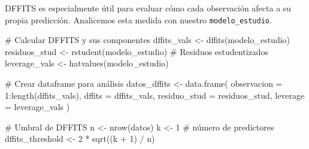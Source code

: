 \documentclass[
  letterpaper,
  DIV=11,
  numbers=noendperiod]{scrreprt}
\newenvironment{Shaded}{\begin{snugshade}}{\end{snugshade}}
\newcommand{\AttributeTok}[1]{\textcolor[rgb]{0.40,0.45,0.13}{#1}}
\newcommand{\CommentTok}[1]{\textcolor[rgb]{0.37,0.37,0.37}{#1}}
\newcommand{\DecValTok}[1]{\textcolor[rgb]{0.68,0.00,0.00}{#1}}
\newcommand{\FunctionTok}[1]{\textcolor[rgb]{0.28,0.35,0.67}{#1}}
\newcommand{\NormalTok}[1]{\textcolor[rgb]{0.00,0.23,0.31}{#1}}
\newcommand{\OtherTok}[1]{\textcolor[rgb]{0.00,0.23,0.31}{#1}}
\newcommand{\SpecialCharTok}[1]{\textcolor[rgb]{0.37,0.37,0.37}{#1}}
\begin{document}
\begin{tcolorbox}[enhanced jigsaw, breakable, toprule=.15mm, bottomtitle=1mm, coltitle=black, colbacktitle=quarto-callout-tip-color!10!white, titlerule=0mm, opacitybacktitle=0.6, bottomrule=.15mm, toptitle=1mm, title=\textcolor{quarto-callout-tip-color}{\faLightbulb}\hspace{0.5em}{Ejemplo: Cálculo y análisis de DFFITS}, arc=.35mm, rightrule=.15mm, opacityback=0, colframe=quarto-callout-tip-color-frame, leftrule=.75mm, left=2mm, colback=white]

DFFITS es especialmente útil para evaluar cómo cada observación afecta a
su propia predicción. Analicemos esta medida con nuestro
\texttt{modelo\_estudio}.

\begin{Shaded}
\begin{Highlighting}[]
\CommentTok{\# Calcular DFFITS y sus componentes}
\NormalTok{dffits\_vals }\OtherTok{\textless{}{-}} \FunctionTok{dffits}\NormalTok{(modelo\_estudio)}
\NormalTok{residuos\_stud }\OtherTok{\textless{}{-}} \FunctionTok{rstudent}\NormalTok{(modelo\_estudio)  }\CommentTok{\# Residuos estudentizados}
\NormalTok{leverage\_vals }\OtherTok{\textless{}{-}} \FunctionTok{hatvalues}\NormalTok{(modelo\_estudio)}

\CommentTok{\# Crear dataframe para análisis}
\NormalTok{datos\_dffits }\OtherTok{\textless{}{-}} \FunctionTok{data.frame}\NormalTok{(}
  \AttributeTok{observacion =} \DecValTok{1}\SpecialCharTok{:}\FunctionTok{length}\NormalTok{(dffits\_vals),}
  \AttributeTok{dffits =}\NormalTok{ dffits\_vals,}
  \AttributeTok{residuo\_stud =}\NormalTok{ residuos\_stud,}
  \AttributeTok{leverage =}\NormalTok{ leverage\_vals}
\NormalTok{)}

\CommentTok{\# Umbral de DFFITS}
\NormalTok{n }\OtherTok{\textless{}{-}} \FunctionTok{nrow}\NormalTok{(datos)}
\NormalTok{k }\OtherTok{\textless{}{-}} \DecValTok{1}  \CommentTok{\# número de predictores}
\NormalTok{dffits\_threshold }\OtherTok{\textless{}{-}} \DecValTok{2} \SpecialCharTok{*} \FunctionTok{sqrt}\NormalTok{((k }\SpecialCharTok{+} \DecValTok{1}\NormalTok{) }\SpecialCharTok{/}\NormalTok{ n)}


\end{Highlighting}
\end{Shaded}
\end{tcolorbox}
\end{document}

